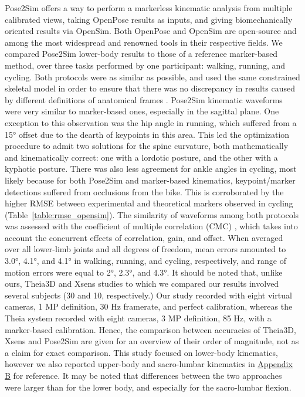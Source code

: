 Pose2Sim offers a way to perform a markerless kinematic analysis from multiple calibrated views, taking OpenPose results as inputs, and giving biomechanically oriented results via OpenSim. Both OpenPose and OpenSim are open-source and among the most widespread and renowned tools in their respective fields. We compared Pose2Sim lower-body results to those of a reference marker-based method, over three tasks performed by one participant: walking, running, and cycling. Both protocols were as similar as possible, and used the same constrained skeletal model in order to ensure that there was no discrepancy in results caused by different definitions of anatomical frames \cite{Croce1999}. Pose2Sim kinematic waveforms were very similar to marker-based ones, especially in the sagittal plane. One exception to this observation was the hip angle in running, which suffered from a 15° offset due to the dearth of keypoints in this area. This led the optimization procedure to admit two solutions for the spine curvature, both mathematically and kinematically correct: one with a lordotic posture, and the other with a kyphotic posture. There was also less agreement for ankle angles in cycling, most likely because for both Pose2Sim and marker-based kinematics, keypoint/marker detections suffered from occlusions from the bike. This is corroborated by the higher RMSE between experimental and theoretical markers observed in cycling (Table~\ref{table:rmse_opensim}). The similarity of waveforms among both protocols was assessed with the coefficient of multiple correlation (CMC) \cite{Ferrari2010}, which takes into account the concurrent effects of correlation, gain, and offset. When averaged over all lower-limb joints and all degrees of freedom, mean errors amounted to 3.0°, 4.1°, and 4.1° in walking, running, and cycling, respectively, and range of motion errors were equal to 2°, 2.3°, and 4.3°. It should be noted that, unlike ours, Theia3D \cite{Kanko2021b} and Xsens \cite{Zhang2013} studies to which we compared our results involved several subjects (30 and 10, respectively.) Our study recorded with eight virtual cameras, 1 MP definition, 30 Hz framerate, and perfect calibration, whereas the Theia system recorded with eight cameras, 3 MP definition, 85 Hz, with a marker-based calibration. Hence, the comparison between accuracies of Theia3D, Xsens and Pose2Sim are given for an overview of their order of magnitude, not as a claim for exact comparison. This study focused on lower-body kinematics, however we also reported upper-body and sacro-lumbar kinematics in \hyperref[Ann:2]{Appendix B} for reference. It may be noted that differences between the two approaches were larger than for the lower body, and especially for the sacro-lumbar flexion.


